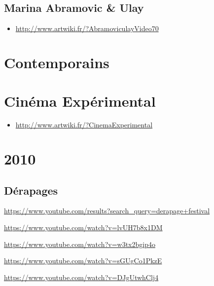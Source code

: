 \documentclass[
]{book}
\providecommand{\tightlist}{%
  \setlength{\itemsep}{0pt}\setlength{\parskip}{0pt}}
\begin{document}
\hypertarget{marina-abramovic-ulay}{%
\subsection{Marina Abramovic \& Ulay}\label{marina-abramovic-ulay}}

\begin{itemize}
\tightlist
\item
  \url{http://www.artwiki.fr/?AbramoviculayVideo70}
\end{itemize}

\hypertarget{contemporains}{%
\section{Contemporains}\label{contemporains}}

\hypertarget{section-2}{%
\subsection{}\label{section-2}}

\hypertarget{cinuxe9ma-expuxe9rimental}{%
\section{Cinéma Expérimental}\label{cinuxe9ma-expuxe9rimental}}

\begin{itemize}
\tightlist
\item
  \url{http://www.artwiki.fr/?CinemaExperimental}
\end{itemize}

\hypertarget{section-3}{%
\section{2010}\label{section-3}}

\hypertarget{duxe9rapages}{%
\subsection{Dérapages}\label{duxe9rapages}}

\url{https://www.youtube.com/results?search_query=derapage+festival}

\url{https://www.youtube.com/watch?v=lvUH7b8x1DM}

\url{https://www.youtube.com/watch?v=w3tx2bgip4o}

\url{https://www.youtube.com/watch?v=sGUgCo1PkzE}

\url{https://www.youtube.com/watch?v=DJgUtwhClj4}
\end{document}
